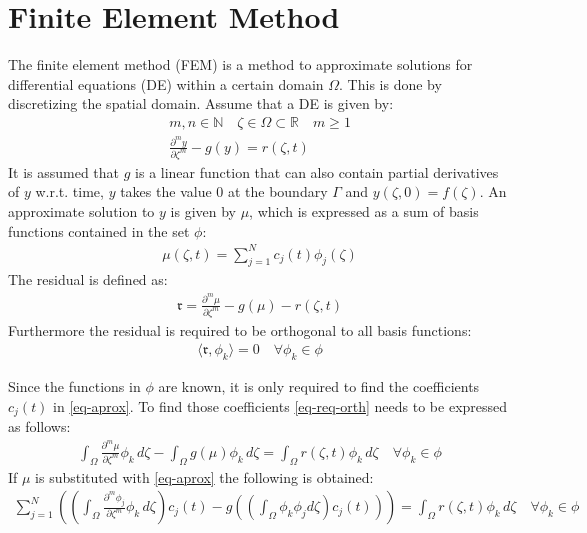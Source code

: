 \section{Finite Element Method} \label{FEM}
The finite element method (FEM) is a method to approximate solutions for differential equations (DE) within a certain domain \(\Omega\).
This is done by discretizing the spatial domain.
Assume that a DE is given by:
\begin{gather}
m, n \in \mathbb{N} \quad \zeta \in \Omega \subset \mathbb{R} \quad m \geq 1 \\
\frac{\partial^{m} y}{\partial \zeta^{m}} -  g(y) = r(\zeta, t) \label{eq-pde-gen} 
\end{gather}
It is assumed that \(g\) is a linear function that can also contain partial derivatives of \(y\) w.r.t. time, \(y\) takes the value 0 at the boundary \(\Gamma\) and \(y(\zeta, 0) = f(\zeta)\).
An approximate solution to \(y\) is given by \(\mu\), which is expressed as a sum of basis functions contained in the set \(\phi\):
\begin{gather}
\mu(\zeta, t) = \sum_{j = 1}^{N} c_{j}(t)\phi_{j}(\zeta) \label{eq-aprox}
\end{gather}
The residual is defined as:
\begin{gather}
\mathfrak{r} = \frac{\partial^{m} \mu}{\partial \zeta^{m}} -  g(\mu) - r(\zeta, t) 
\end{gather}
Furthermore the residual is required to be orthogonal to all basis functions:
\begin{gather}
\langle \mathfrak{r}, \phi_{k} \rangle = 0 \quad \forall \phi_{k} \in \phi \label{eq-req-orth}
\end{gather}

Since the functions in \(\phi\) are known, it is only required to find the coefficients \(c_{j}(t)\) in \ref{eq-aprox}.
To find those coefficients \ref{eq-req-orth} needs to be expressed as follows:
\begin{gather}
\int_{\Omega} \frac{\partial^{m} \mu}{\partial \zeta^{m}} \phi_{k} \, d\zeta  -  \int_{\Omega} g(\mu) \phi_{k}        \, d\zeta = \int_{\Omega}  r(\zeta, t) \phi_{k}        \, d\zeta \quad \forall \phi_{k} \in \phi 
\end{gather}
If \(\mu\) is substituted with \ref{eq-aprox} the following is obtained:
\begin{gather}
\sum_{j = 1}^{N} ((\int_{\Omega} \frac{\partial^{m} \phi_{j}}{\partial \zeta^{m}} \phi_{k} \, d\zeta) c_{j}(t) - g((\int_{\Omega} \phi_k \phi_j d\zeta) c_{j}(t)))  = \int_{\Omega}  r(\zeta, t) \phi_{k}        \, d\zeta \quad \forall \phi_{k} \in \phi \label{eq-al}
\end{gather}

